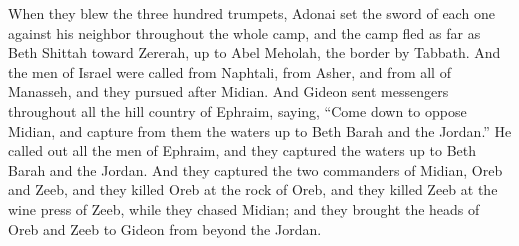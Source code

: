 \begin{biblechapter}
\verse When they blew the three hundred trumpets, Adonai set the sword of each one against his neighbor throughout the whole camp, and the camp fled as far as Beth Shittah toward Zererah, up to Abel Meholah, the border by Tabbath.
\verse And the men of Israel were called from Naphtali, from Asher, and from all of Manasseh, and they pursued after Midian.
\verse And Gideon sent messengers throughout all the hill country of Ephraim, saying, “Come down to oppose Midian, and capture from them the waters up to Beth Barah and the Jordan.” He called out all the men of Ephraim, and they captured the waters up to Beth Barah and the Jordan.
\verse And they captured the two commanders of Midian, Oreb and Zeeb, and they killed Oreb at the rock of Oreb, and they killed Zeeb at the wine press of Zeeb, while they chased Midian; and they brought the heads of Oreb and Zeeb to Gideon from beyond the Jordan.
\end{biblechapter}

